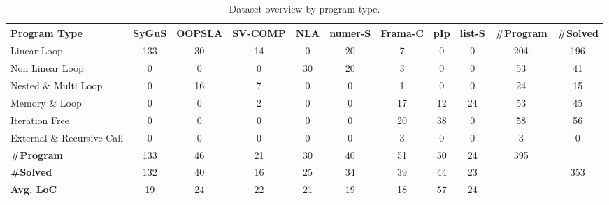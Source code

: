 \begin{table}[htbp]
\centering
\small
\renewcommand{\arraystretch}{0.95}
\setlength{\tabcolsep}{4pt}
\caption{Dataset overview by program type.}
\label{tab:dataset_overview}
\begin{adjustbox}{max width=\textwidth}
\begin{tabular}{
    l
    c
    c
    c
    c
    c
    c
    c
    c
    c
    c
}
\toprule
\textbf{Program Type}  & \textbf{SyGuS} & \textbf{OOPSLA}   & \textbf{SV-COMP}  & \textbf{NLA}  & \textbf{numer-S}  & \textbf{Frama-C}  & \textbf{pIp}  & \textbf{list-S} & \textbf{\#Program} & \textbf{\#Solved} \\
\midrule
Linear Loop                  & {\cellcolor{figloop!68}133} & {\cellcolor{figloop!55}30} & {\cellcolor{figloop!38}14} & {\cellcolor{figloop!18}0}  & {\cellcolor{figloop!43}20} & {\cellcolor{figcontract!32}7}  & {\cellcolor{figcontract!18}0}  & {\cellcolor{figcontract!18}0}  & 204 & 196 \\
Non Linear Loop              & {\cellcolor{figloop!18}0}   & {\cellcolor{figloop!18}0}  & {\cellcolor{figloop!18}0}  & {\cellcolor{figloop!55}30} & {\cellcolor{figloop!43}20} & {\cellcolor{figcontract!24}3}  & {\cellcolor{figcontract!18}0}  & {\cellcolor{figcontract!18}0}  & 53  & 41  \\
Nested \& Multi Loop         & {\cellcolor{figloop!18}0}   & {\cellcolor{figloop!40}16} & {\cellcolor{figloop!28}7}  & {\cellcolor{figloop!18}0}  & {\cellcolor{figloop!18}0}  & {\cellcolor{figcontract!20}1}  & {\cellcolor{figcontract!18}0}  & {\cellcolor{figcontract!18}0}  & 24  & 15  \\
Memory \& Loop               & {\cellcolor{figloop!18}0}   & {\cellcolor{figloop!18}0}  & {\cellcolor{figloop!22}2}  & {\cellcolor{figloop!18}0}  & {\cellcolor{figloop!18}0}  & {\cellcolor{figcontract!38}17} & {\cellcolor{figcontract!35}12} & {\cellcolor{figcontract!38}24} & 53  & 45  \\
Iteration Free               & {\cellcolor{figloop!18}0}   & {\cellcolor{figloop!18}0}  & {\cellcolor{figloop!18}0}  & {\cellcolor{figloop!18}0}  & {\cellcolor{figloop!18}0}  & {\cellcolor{figcontract!48}20} & {\cellcolor{figcontract!62}38} & {\cellcolor{figcontract!18}0}  & 58  & 56  \\
External \& Recursive Call  & {\cellcolor{figloop!18}0}   & {\cellcolor{figloop!18}0}  & {\cellcolor{figloop!18}0}  & {\cellcolor{figloop!18}0}  & {\cellcolor{figloop!18}0}  & {\cellcolor{figcontract!24}3}  & {\cellcolor{figcontract!18}0}  & {\cellcolor{figcontract!18}0}  & 3   & 0   \\
\midrule
\textbf{\#Program} & 133 & 46 & 21 & 30 & 40 &  51 & 50 & 24 & 395  \\
\textbf{\#Solved}  & 132 & 40 & 16 & 25 & 34 &  39 & 44 & 23 &      & 353 \\
\textbf{Avg. LoC}  & 19  & 24 & 22 & 21 & 19 &  18 & 57 & 24 &      &     \\
\bottomrule
\end{tabular}%
\end{adjustbox}
\end{table}

